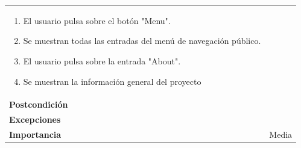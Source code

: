 \documentclass[
]{article}
\providecommand{\tightlist}{%
  \setlength{\itemsep}{0pt}\setlength{\parskip}{0pt}}
\begin{document}
\begin{longtable}[]{@{}ll@{}}
\begin{minipage}[t]{0.67\columnwidth}
\begin{enumerate}
\def\labelenumi{\arabic{enumi}.}
\tightlist
\item
  El usuario pulsa sobre el botón "Menu".
\item
  Se muestran todas las entradas del menú de navegación público.
\item
  El usuario pulsa sobre la entrada "About".
\item
  Se muestran la información general del proyecto
\end{enumerate}\strut
\end{minipage}\tabularnewline
\begin{minipage}[t]{0.27\columnwidth}\raggedright
\textbf{Postcondición}\strut
\end{minipage} & \begin{minipage}[t]{0.67\columnwidth}\raggedright
\strut
\end{minipage}\tabularnewline
\begin{minipage}[t]{0.27\columnwidth}\raggedright
\textbf{Excepciones}\strut
\end{minipage} & \begin{minipage}[t]{0.67\columnwidth}\raggedright
\strut
\end{minipage}\tabularnewline
\begin{minipage}[t]{0.27\columnwidth}\raggedright
\textbf{Importancia}\strut
\end{minipage} & \begin{minipage}[t]{0.67\columnwidth}\raggedright
Media\strut
\end{minipage}\tabularnewline
\bottomrule
\end{longtable}
\end{document}
